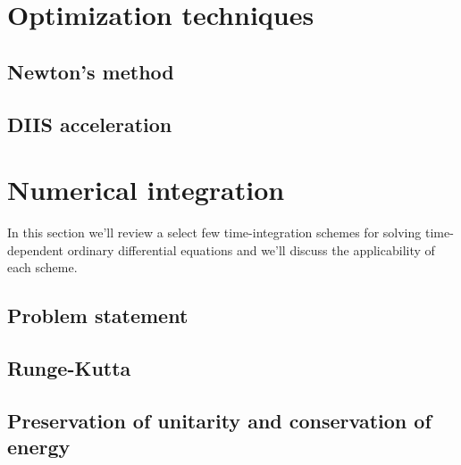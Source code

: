     \section{Optimization techniques}
        \subsection{Newton's method}
        \subsection{DIIS acceleration}
    \section{Numerical integration}
        In this section we'll review a select few time-integration schemes for
        solving time-dependent ordinary differential equations and we'll discuss the
        applicability of each scheme.

        \subsection{Problem statement}
        \subsection{Runge-Kutta}
        \subsection{Preservation of unitarity and conservation of energy}
